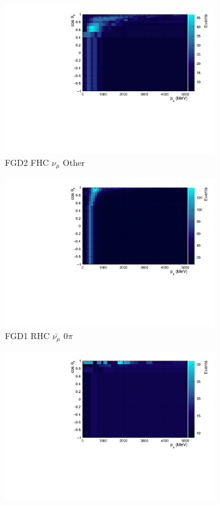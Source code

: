 \begin{figure}
\begin{subfigure}{.32\textwidth}
  \includegraphics[width=0.95\linewidth]{figs/TH2PolyNom_MC_FGD2_numuCC_other}
  \caption{FGD2 FHC $\nu_{\mu}$ Other}
  \label{fig:th2polynomFGD2_numuCC_other}
\end{subfigure}
\centering
\begin{subfigure}{.32\textwidth}
  \centering
  \includegraphics[width=0.95\linewidth]{figs/TH2PolyNom_MC_FGD1_anti-numuCC_0pi}
  \caption{FGD1 RHC $\bar{\nu_{\mu}}$ 0$\pi$}
  \label{fig:th2polynomFGD1_anti-numuCC_0pi}
\end{subfigure}
\begin{subfigure}{.32\textwidth}
  \centering
  \includegraphics[width=0.95\linewidth]{figs/TH2PolyNom_MC_FGD1_anti-numuCC_1pi}

\end{subfigure}
\end{figure}

